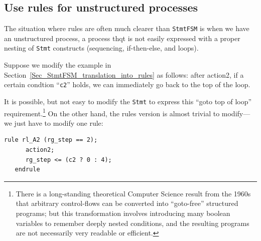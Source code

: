 
\subsection{Use rules for unstructured processes}

The situation where rules are often much clearer than \verb|StmtFSM|
is when we have an unstructured process, {\ie} a process thqt is not
easily expressed with a proper nesting of \verb|Stmt| constructs
(sequencing, if-then-else, and loops).

Suppose we modify the example in
Section~\ref{Sec_StmtFSM_translation_into_rules} as follows: after
action2, if a certain condtion ``\verb|c2|'' holds, we can immediately
go back to the top of the loop.

It is possible, but not easy to modify the \verb|Stmt| to express this
``goto top of loop'' requirement.\footnote{There is a long-standing
theoretical Computer Science result from the 1960s that arbitrary
control-flows can be converted into ``goto-free'' structured programs;
but this transformation involves introducing many boolean variables to
remember deeply nested conditions, and the resulting programs are not
necessarily very readable or efficient.}  On the other hand, the rules
version is almost trivial to modify---we just have to modify one rule:

{\footnotesize
\begin{Verbatim}[frame=single,label=BSV]
   rule rl_A2 (rg_step == 2);
      action2;
      rg_step <= (c2 ? 0 : 4);
   endrule
\end{Verbatim}
}

